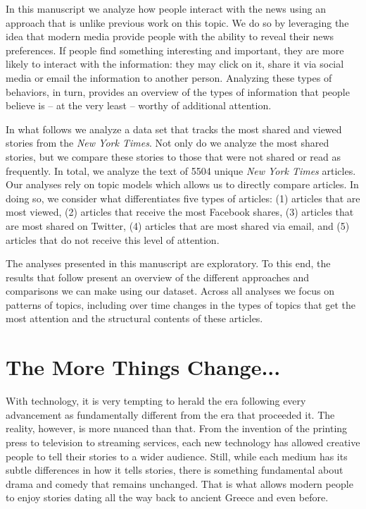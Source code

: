 \documentclass[12pt]{article}
\begin{document}
\begin{doublespace}
In this manuscript we analyze how people interact with the news using an approach that is unlike previous work on this topic. We do so by leveraging the idea that modern media provide people with the ability to reveal their news preferences. If people find something interesting and important, they are more likely to interact with the information: they may click on it, share it via social media or email the information to another person.  Analyzing these types of behaviors, in turn, provides an overview of the types of information that people believe is -- at the very least -- worthy of additional attention.

In what follows we analyze a data set that tracks the most shared and viewed stories from the \textit{New York Times}.  Not only do we analyze the most shared stories, but we compare these stories to those that were not shared or read as frequently. In total, we analyze the text of 5504 unique \textit{New York Times} articles.  Our analyses rely on topic models which allows us to directly compare articles. In doing so, we consider what differentiates five types of articles: (1) articles that are most viewed, (2) articles that receive the most Facebook shares, (3) articles that are most shared on Twitter, (4) articles that are most shared via email, and (5) articles that do not receive this level of attention.

The analyses presented in this manuscript are exploratory.   To this end, the results that follow present an overview of the different approaches and comparisons we can make using our dataset. Across all analyses we focus on patterns of topics, including over time changes in the types of topics that get the most attention and the structural contents of these articles.

\section{The More Things Change...}

With technology, it is very tempting to herald the era following every advancement as fundamentally different from the era that proceeded it. The reality, however, is more nuanced than that. From the invention of the printing press to television to streaming services, each new technology has allowed creative people to tell their stories to a wider audience. Still, while each medium has its subtle differences in how it tells stories, there is something fundamental about drama and comedy that remains unchanged. That is what allows modern people to enjoy stories dating all the way back to ancient Greece and even before.


\end{doublespace}
\end{document}
